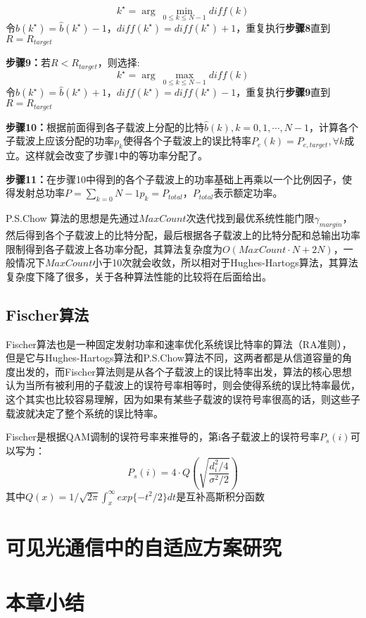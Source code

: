 \begin{description}
\begin{equation}
k^{\star} =\arg\ \underset{0\leq k\leq N-1}{\min}diff(k)
\end{equation}
令$\hat{b}(k^{\star})=\hat{b}(k^{\star})-1$，$diff(k^{\star})=diff(k^{\star})+1$，重复执行\textbf{步骤8}直到$R=R_{target}$
\item{\bf{步骤9：}}若$R<R_{target}$，则选择:
\begin{equation}
k^{\star} =\arg\ \underset{0\leq k\leq N-1}{\max}diff(k)
\end{equation}
令$\hat{b}(k^{\star})=\hat{b}(k^{\star})+1$，$diff(k^{\star})=diff(k^{\star})-1$，重复执行\textbf{步骤9}直到$R=R_{target}$
\item{\bf{步骤10：}}根据前面得到各子载波上分配的比特$\hat{b}(k), k=0,1,\cdots,N-1$，计算各个子载波上应该分配的功率$p_k$使得各个子载波上的误比特率$P_e(k)=P_{e,target}, \forall k$成立。这样就会改变了步骤1中的等功率分配了。
\item{\bf{步骤11：}}在步骤10中得到的各个子载波上的功率基础上再乘以一个比例因子，使得发射总功率$P=\sum_{k=0}{N-1}p_k=P_{total}$，$P_{total}$表示额定功率。
\end{description}

P.S.Chow 算法的思想是先通过$MaxCount$次迭代找到最优系统性能门限$\gamma_{margin}$，然后得到各个子载波上的比特分配，最后根据各子载波上的比特分配和总输出功率限制得到各子载波上各功率分配，其算法复杂度为$O(MaxCount\cdot N+2N)$，一般情况下$MaxCount$小于10次就会收敛，所以相对于Hughes-Hartogs算法，其算法复杂度下降了很多，关于各种算法性能的比较将在后面给出。
\subsection{Fischer算法}
Fischer算法\cite{fischer1996new}也是一种固定发射功率和速率优化系统误比特率的算法（RA准则），但是它与Hughes-Hartogs算法和P.S.Chow算法不同，这两者都是从信道容量的角度出发的，而Fischer算法则是从各个子载波上的误比特率出发，算法的核心思想认为当所有被利用的子载波上的误符号率相等时，则会使得系统的误比特率最优，这个其实也比较容易理解，因为如果有某些子载波的误符号率很高的话，则这些子载波就决定了整个系统的误比特率。

Fischer是根据QAM调制的误符号率来推导的，第i各子载波上的误符号率$P_s(i)$可以写为：
\begin{equation}
P_s(i)=4\cdot Q\left(\sqrt{\frac{d_i^2/4}{\sigma^2/2}}\right)
\end{equation}
其中$Q(x)=1/\sqrt{2\pi}\int_x^{\infty}exp\{-t^2/2\}dt$是互补高斯积分函数
\section{可见光通信中的自适应方案研究}
\section{本章小结}


